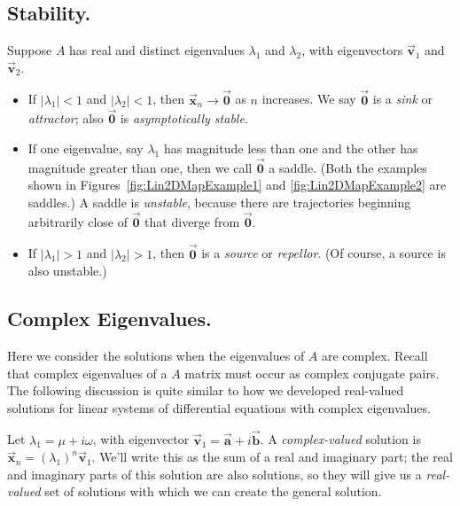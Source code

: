 \documentclass[reqno]{immbook}
\newcommand{\BA}{\vec{\textbf{a}}}
\newcommand{\BB}{\vec{\textbf{b}}}
\newcommand{\BV}{\vec{\textbf{v}}}
\newcommand{\BX}{\vec{\textbf{x}}}
\newcommand{\BZero}{\vec{\textbf{0}}}  %
\numberwithin{equation}{chapter}
\numberwithin{question}{section}
\numberwithin{theorem}{chapter}
\numberwithin{figure}{chapter}
\theoremstyle{definition}
\begin{document}
\subsection*{Stability.}
Suppose $A$ has real and distinct eigenvalues
$\lambda_1$ and $\lambda_2$, with eigenvectors
$\BV_1$ and $\BV_2$.
\begin{itemize}
\item If $|\lambda_1|<1$ and $|\lambda_2|<1$, then
$\BX_n\rightarrow\BZero$ as $n$ increases.  We say
$\BZero$ is a \emph{sink} or \emph{attractor}; also
$\BZero$ is \emph{asymptotically stable}.
\item If one eigenvalue, say $\lambda_1$ has magnitude less than
one and the other has magnitude greater than one, then
we call $\BZero$ a saddle.  (Both the examples shown in
Figures~\ref{fig:Lin2DMapExample1} and \ref{fig:Lin2DMapExample2}
are saddles.) A saddle is \emph{unstable}, because there
are trajectories beginning arbitrarily close of $\BZero$ that
diverge from $\BZero$.
\item If $|\lambda_1|>1$ and $|\lambda_2|>1$, then
$\BZero$ is a \emph{source} or \emph{repellor}.  (Of course,
a source is also unstable.)
\end{itemize}
%
%
\subsection*{Complex Eigenvalues.}
Here we consider the solutions when the eigenvalues of
$A$ are complex.  Recall that complex eigenvalues of a $A$
matrix must occur as complex conjugate pairs.
The following discussion is quite similar to how
we developed real-valued solutions for linear systems
of differential equations with complex eigenvalues.
 
Let $\lambda_1=\mu + i\omega$,
with eigenvector $\BV_1 = \BA + i \BB$.
A \emph{complex-valued} solution is
$\BX_n = (\lambda_1)^n\BV_1$.
We'll write this as the sum of a real and imaginary part;
the real and imaginary parts of this solution are also solutions,
so they will give us a \emph{real-valued} set of solutions
with which we can create the general solution.
\end{document}

